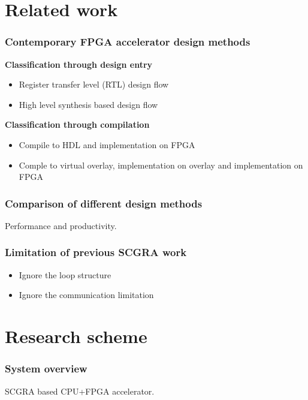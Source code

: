 \documentclass{beamer}
\begin{document}
\section{Related work}
\begin{frame}
\frametitle{Contemporary FPGA accelerator design methods}
\textbf{Classification through design entry}
\begin{itemize}
\item Register transfer level (RTL) design flow
\item High level synthesis based design flow
\end{itemize}

\textbf{Classification through compilation}
\begin{itemize}
\item Compile to HDL and implementation on FPGA
\item Comple to virtual overlay, implementation on overlay and implementation on FPGA
\end{itemize}

\end{frame}

\begin{frame}

\frametitle{Comparison of different design methods}
Performance and productivity.

\end{frame}

\begin{frame}

\frametitle{Limitation of previous SCGRA work}
\begin{itemize}
\item Ignore the loop structure
\item Ignore the communication limitation
\end{itemize}

\end{frame}

\section{Research scheme}
\begin{frame}

\frametitle{System overview}
SCGRA based CPU+FPGA accelerator.

\end{frame}
\end{document}
